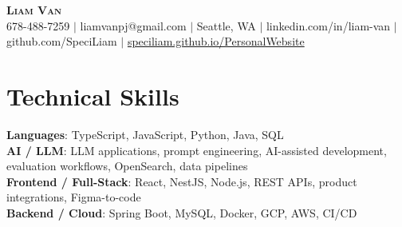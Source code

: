 \documentclass[letterpaper,11pt]{article}
\begin{document}

%
\begin{center}
    \textbf{\Huge \scshape Liam Van} \\ \vspace{1pt}
    \small 678-488-7259 $|$ \small {liamvanpj@gmail.com} $|$ Seattle, WA
 {{$|$ linkedin.com/in/liam-van} {$|$ github.com/SpeciLiam} {$|$ \href{https://speciliam.github.io/PersonalWebsite}{speciliam.github.io/PersonalWebsite}}}

\end{center}

\section{Technical Skills}
 \begin{itemize}[leftmargin=0.15in, label={}]
    \small{\item{
     \textbf{Languages}{: TypeScript, JavaScript, Python, Java, SQL} \\
     \textbf{AI / LLM}{: LLM applications, prompt engineering, AI-assisted development, evaluation workflows, OpenSearch, data pipelines} \\
     \textbf{Frontend / Full-Stack}{: React, NestJS, Node.js, REST APIs, product integrations, Figma-to-code} \\
     \textbf{Backend / Cloud}{: Spring Boot, MySQL, Docker, GCP, AWS, CI/CD} \\
    }}
 \end{itemize}
%

\end{document}
